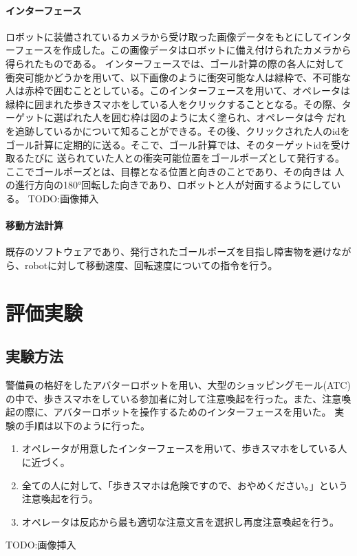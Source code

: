 \documentclass[11pt,a4j]{jreport}
\begin{document}
\subsubsection{インターフェース}
ロボットに装備されているカメラから受け取った画像データをもとにしてインターフェースを作成した。この画像データはロボットに備え付けられたカメラから得られたものである。
インターフェースでは、ゴール計算の際の各人に対して衝突可能かどうかを用いて、以下画像のように衝突可能な人は緑枠で、不可能な人は赤枠で囲むこととしている。このインターフェースを用いて、オペレータは
緑枠に囲まれた歩きスマホをしている人をクリックすることとなる。その際、ターゲットに選ばれた人を囲む枠は図のように太く塗られ、オペレータは今
だれを追跡しているかについて知ることができる。その後、クリックされた人のidをゴール計算に定期的に送る。そこで、ゴール計算では、そのターゲットidを受け取るたびに
送られていた人との衝突可能位置をゴールポーズとして発行する。ここでゴールポーズとは、目標となる位置と向きのことであり、その向きは
人の進行方向の180°回転した向きであり、ロボットと人が対面するようにしている。
TODO:画像挿入

\subsubsection{移動方法計算}
既存のソフトウェアであり、発行されたゴールポーズを目指し障害物を避けながら、robotに対して移動速度、回転速度についての指令を行う。



\chapter{評価実験}
\section{実験方法}
警備員の格好をしたアバターロボットを用い、大型のショッピングモール(ATC)の中で、歩きスマホをしている参加者に対して注意喚起を行った。また、注意喚起の際に、アバターロボットを操作するためのインターフェースを用いた。
実験の手順は以下のように行った。
\begin{enumerate}
  \item オペレータが用意したインターフェースを用いて、歩きスマホをしている人に近づく。
  \item 全ての人に対して、「歩きスマホは危険ですので、おやめください。」という注意喚起を行う。
  \item オペレータは反応から最も適切な注意文言を選択し再度注意喚起を行う。
\end{enumerate}
TODO:画像挿入
\end{document}
